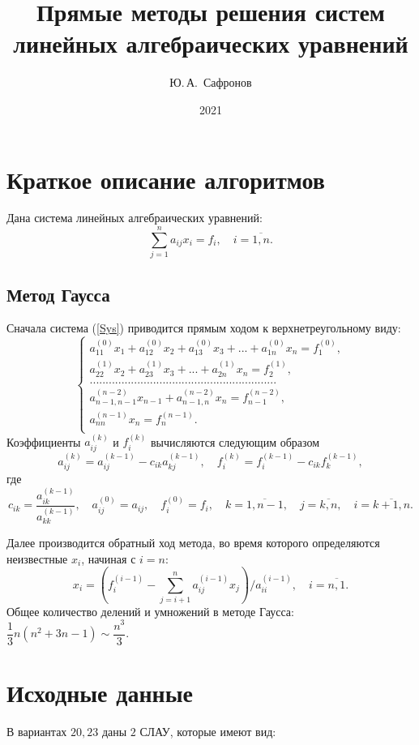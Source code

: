 \documentclass[12pt, a4paper]{article}
\title{Прямые методы решения систем линейных алгебраических уравнений}
\author{Ю.\,А.~Сафронов}
\date{2021}
\begin{document}
\maketitle
\tableofcontents 
\newpage

\section{Краткое описание алгоритмов}
Дана система линейных алгебраических уравнений:
\begin{equation}
\sum_{j=1}^{n} a_{ij}x_i = f_i , \quad i = \overline{1,n}.
\label{Sys}
\end{equation}

\subsection{Метод Гаусса}
Сначала система (\ref{Sys}) приводится прямым ходом к верхнетреугольному виду: 
\[\left\{
\begin{aligned}
a_{11}^{(0)}x_1 + a_{12}^{(0)}x_2 + a_{13}^{(0)}x_3 + ... + a_{1n}^{(0)}x_n = f_1^{(0)},\\
a_{22}^{(1)}x_2 + a_{23}^{(1)}x_3 + ... + a_{2n}^{(1)}x_n = f_2^{(1)},\\
...........................................................\\
a_{n-1,n-1}^{(n-2)}x_{n-1} + a_{n-1,n}^{(n-2)}x_n = f_{n-1}^{(n-2)},\\
a_{nn}^{(n-1)}x_n = f_{n}^{(n-1)}.\\
\end{aligned}
\right.
\]
Коэффициенты $a_{ij}^{(k)}$ и $f_i^{(k)}$ вычисляются следующим образом
\[
a_{ij}^{(k)} = a_{ij}^{(k-1)} - c_{ik}a_{kj}^{(k-1)}, \quad f_{i}^{(k)} = f_{i}^{(k-1)} - c_{ik}f_{k}^{(k-1)}, 
\]
где
\[
c_{ik} = \dfrac{a_{ik}^{(k-1)}}{a_{kk}^{(k-1)}}, \quad a_{ij}^{(0)}=a_{ij}, \quad f_{i}^{(0)} = f_i, \quad k = \overline{1,n-1},\quad j =\overline{k,n}, \quad i = \overline{k+1,n}.
\]

Далее производится обратный ход метода, во время которого определяются неизвестные $x_i$, начиная с $i = n$:
\[
x_i =\left(f_i^{(i-1)}-\sum_{j=i+1}^{n} a_{ij}^{(i-1)}x_j\right)/a_{ii}^{(i-1)}, \quad i = \overline{n,1}.
\]
Общее количество делений и умножений в методе Гаусса: $\dfrac{1}{3}n(n^2+3n-1) \sim \dfrac{n^3}{3}$.

\newpage

\section{Исходные данные}
В вариантах $20, 23$ даны $2$ СЛАУ, которые имеют вид: 
\end{document}

